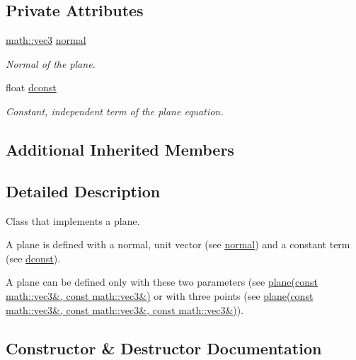\subsection*{Private Attributes}
\begin{DoxyCompactItemize}
\item 
\hyperlink{structphysim_1_1math_1_1vec3}{math\+::vec3} \hyperlink{classphysim_1_1geometric_1_1plane_a373cd794f689cf83458f6c6f051b59d9}{normal}
\begin{DoxyCompactList}\small\item\em Normal of the plane. \end{DoxyCompactList}\item 
\mbox{\label{classphysim_1_1geometric_1_1plane_a940e09edec2fddf9b8de42d6f6826c1f}} 
float \hyperlink{classphysim_1_1geometric_1_1plane_a940e09edec2fddf9b8de42d6f6826c1f}{dconst}
\begin{DoxyCompactList}\small\item\em Constant, independent term of the plane equation. \end{DoxyCompactList}\end{DoxyCompactItemize}
\subsection*{Additional Inherited Members}


\subsection{Detailed Description}
Class that implements a plane. 

A plane is defined with a normal, unit vector (see \hyperlink{classphysim_1_1geometric_1_1plane_a373cd794f689cf83458f6c6f051b59d9}{normal}) and a constant term (see \hyperlink{classphysim_1_1geometric_1_1plane_a940e09edec2fddf9b8de42d6f6826c1f}{dconst}).

A plane can be defined only with these two parameters (see \hyperlink{classphysim_1_1geometric_1_1plane_a7ebf0374eab0ff75293894fb45b5fe99}{plane(const math\+::vec3\&, const math\+::vec3\&)} or with three points (see \hyperlink{classphysim_1_1geometric_1_1plane_a5d793dd111e0b7c83c7e11b47c037637}{plane(const math\+::vec3\&, const math\+::vec3\&, const math\+::vec3\&)}). 

\subsection{Constructor \& Destructor Documentation}
\mbox{\label{classphysim_1_1geometric_1_1plane_a7ebf0374eab0ff75293894fb45b5fe99}} 
